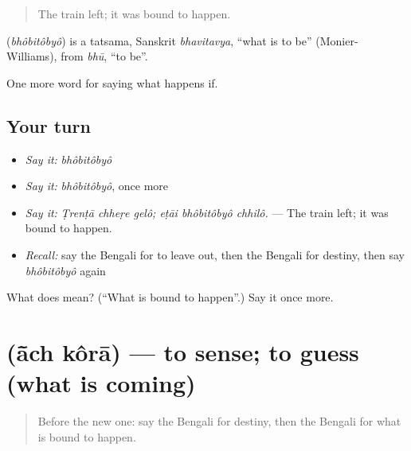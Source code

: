 \begin{quote}
The train left; it was bound to happen.
\end{quote}

\begin{cousinweb}
\textbf{} (\emph{bhôbitôbyô}) is a tatsama, Sanskrit \emph{bhavitavya}, \textquotedblleft{}what is to be\textquotedblright{} (Monier-Williams), from \emph{bhū}, \textquotedblleft{}to be\textquotedblright{}.
\end{cousinweb}

\begin{grammarlens}[title={What you've built}]
One more word for saying what happens if.
\end{grammarlens}

\subsection*{Your turn}
\begin{itemize}
\raggedright
  \item \emph{Say it:} \emph{bhôbitôbyô}
  \item \emph{Say it:} \emph{bhôbitôbyô}, once more
  \item \emph{Say it:} \emph{Ṭrenṭā chheṛe gelô; eṭāi bhôbitôbyô chhilô.} — The train left; it was bound to happen.
  \item \emph{Recall:} say the Bengali for to leave out, then the Bengali for destiny, then say \emph{bhôbitôbyô} again
\end{itemize}

\begin{tcolorbox}[breakable,colback=teal!4,colframe=teal!35!black,title={Before you move on}]
What does  mean? (\textquotedblleft{}What is bound to happen\textquotedblright{}.) Say it once more.
\end{tcolorbox}
\section[\texorpdfstring{\bn{আঁচ} \bn{করা} (ā̃ch kôrā)}{আঁচ করা (ā̃ch kôrā)}]{  (ā̃ch kôrā) — to sense; to guess (what is coming)}

\label{lesson:BN-C532-ach-kora}



\begin{quote}
Before the new one: say the Bengali for destiny, then the Bengali for what is bound to happen.
\end{quote}

